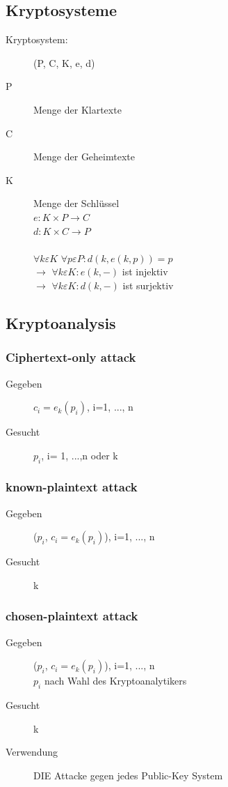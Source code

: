 \documentclass[landscape,twocolumn,a4paper]{article}
\newcommand{\ra}{\rightarrow}
\begin{document}
\subsection{Kryptosysteme}
\begin{description}
	\item[Kryptosystem:] (P, C, K, e, d)
	\item[P] Menge der {\color{blue}Klartexte}
	\item[C] Menge der {\color{red}Geheimtexte}
	\item[K] Menge der Schlüssel \\
		$e:K\times P \ra C$ \\
		$d:K\times C \ra P$ \\ \\
		$\forall k \varepsilon K$ $\forall p \varepsilon P: d( k, e (k,p))=p$ \\
		$\ra$ $\forall k \varepsilon K : e (k,-)$ ist {\color{blue}injektiv} \\
		$\ra$ $\forall k \varepsilon K : d (k,-)$ ist {\color{red}surjektiv} \\
\end{description}

\subsection{Kryptoanalysis}
\subsubsection{Ciphertext-only attack}
\begin{description}
	\item[Gegeben] $c_i=e_k(p_i)$, i=1, ..., n
	\item[Gesucht] $p_i$, i= 1, ...,n oder k
\end{description}

\subsubsection{known-plaintext attack}
\begin{description}
	\item[Gegeben] ($p_i$, $c_i=e_k(p_i)$), i=1, ..., n
	\item[Gesucht] k
\end{description}

\subsubsection{chosen-plaintext attack}
\begin{description}
	\item[Gegeben] ($p_i$, $c_i=e_k(p_i)$), i=1, ..., n \\
		$p_i$ nach Wahl des Kryptoanalytikers
	\item[Gesucht] k
	\item[Verwendung] DIE Attacke gegen jedes Public-Key System
\end{description}
\end{document}
